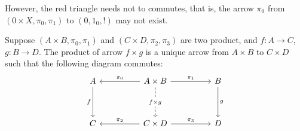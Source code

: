 \documentclass[./main.tex]{subfiles}
\begin{document}
However, the red triangle needs not to commutes, that is,
the arrow $\pi_0$ from $(0 \times X, \pi_0, \pi_1)$ to $(0, 1_0, !)$
may not exist.

\begin{definition}
  Suppose $(A \times B, \pi_0, \pi_1)$ and $(C \times D, \pi_2, \pi_3)$ are two product, and
  $f : A \rightarrow C$, $g : B \rightarrow D$.
  The product of arrow $f \times g$ is a unique arrow from $A \times B$ to $C \times D$
  such that the following diagram commutes:
  \[\begin{tikzcd}
	A && {A \times B} && B \\
	\\
	C && {C \times D} && D
	\arrow["f"', from=1-1, to=3-1]
	\arrow["{\pi_0}"', from=1-3, to=1-1]
	\arrow["{\pi_1}", from=1-3, to=1-5]
	\arrow["{f \times g}"{description}, dashed, from=1-3, to=3-3]
	\arrow["g", from=1-5, to=3-5]
	\arrow["{\pi_2}"', from=3-3, to=3-1]
	\arrow["{\pi_3}", from=3-3, to=3-5]
\end{tikzcd}\]
\end{definition}
\end{document}
